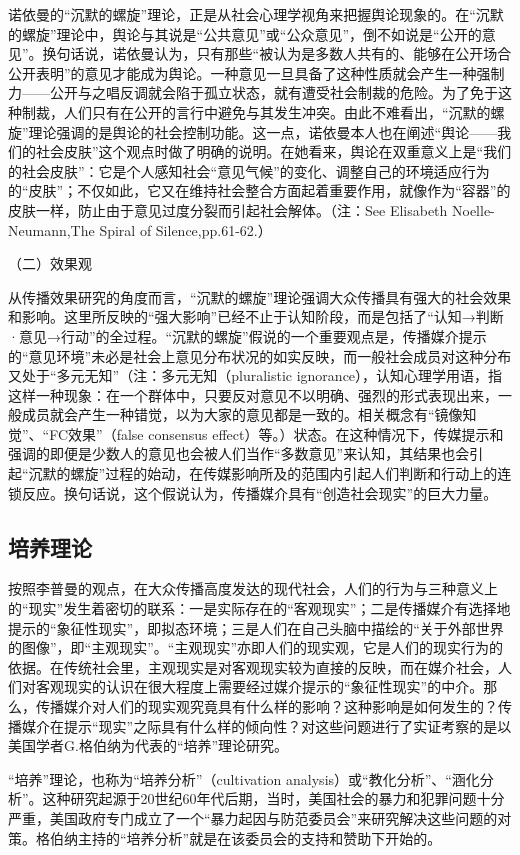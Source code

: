 \documentclass[UTF8,12pt]{ctexart}
\numberwithin{equation}{section} %
\numberwithin{figure}{section}
\numberwithin{table}{section}
\begin{document}
	诺依曼的“沉默的螺旋”理论，正是从社会心理学视角来把握舆论现象的。在“沉默的螺旋”理论中，舆论与其说是“公共意见”或“公众意见”，倒不如说是“公开的意见”。换句话说，诺依曼认为，只有那些“被认为是多数人共有的、能够在公开场合公开表明”的意见才能成为舆论。一种意见一旦具备了这种性质就会产生一种强制力——公开与之唱反调就会陷于孤立状态，就有遭受社会制裁的危险。为了免于这种制裁，人们只有在公开的言行中避免与其发生冲突。由此不难看出，“沉默的螺旋”理论强调的是舆论的社会控制功能。这一点，诺依曼本人也在阐述“舆论——我们的社会皮肤”这个观点时做了明确的说明。在她看来，舆论在双重意义上是“我们的社会皮肤”：它是个人感知社会“意见气候”的变化、调整自己的环境适应行为的“皮肤”；不仅如此，它又在维持社会整合方面起着重要作用，就像作为“容器”的皮肤一样，防止由于意见过度分裂而引起社会解体。（注：See Elisabeth Noelle-Neumann,The Spiral of Silence,pp.61-62.）
	
	（二）效果观
	
	从传播效果研究的角度而言，“沉默的螺旋”理论强调大众传播具有强大的社会效果和影响。这里所反映的“强大影响”已经不止于认知阶段，而是包括了“认知→判断·意见→行动”的全过程。“沉默的螺旋”假说的一个重要观点是，传播媒介提示的“意见环境”未必是社会上意见分布状况的如实反映，而一般社会成员对这种分布又处于“多元无知”（注：多元无知（pluralistic ignorance），认知心理学用语，指这样一种现象：在一个群体中，只要反对意见不以明确、强烈的形式表现出来，一般成员就会产生一种错觉，以为大家的意见都是一致的。相关概念有“镜像知觉”、“FC效果”（false consensus effect）等。）状态。在这种情况下，传媒提示和强调的即便是少数人的意见也会被人们当作“多数意见”来认知，其结果也会引起“沉默的螺旋”过程的始动，在传媒影响所及的范围内引起人们判断和行动上的连锁反应。换句话说，这个假说认为，传播媒介具有“创造社会现实”的巨大力量。
	
	\subsection{培养理论}
	按照李普曼的观点，在大众传播高度发达的现代社会，人们的行为与三种意义上的“现实”发生着密切的联系：一是实际存在的“客观现实”；二是传播媒介有选择地提示的“象征性现实”，即拟态环境；三是人们在自己头脑中描绘的“关于外部世界的图像”，即“主观现实”。“主观现实”亦即人们的现实观，它是人们的现实行为的依据。在传统社会里，主观现实是对客观现实较为直接的反映，而在媒介社会，人们对客观现实的认识在很大程度上需要经过媒介提示的“象征性现实”的中介。那么，传播媒介对人们的现实观究竟具有什么样的影响？这种影响是如何发生的？传播媒介在提示“现实”之际具有什么样的倾向性？对这些问题进行了实证考察的是以美国学者G.格伯纳为代表的“培养”理论研究。
	
	“培养”理论，也称为“培养分析”（cultivation analysis）或“教化分析”、“涵化分析”。这种研究起源于20世纪60年代后期，当时，美国社会的暴力和犯罪问题十分严重，美国政府专门成立了一个“暴力起因与防范委员会”来研究解决这些问题的对策。格伯纳主持的“培养分析”就是在该委员会的支持和赞助下开始的。
	
\end{document}
